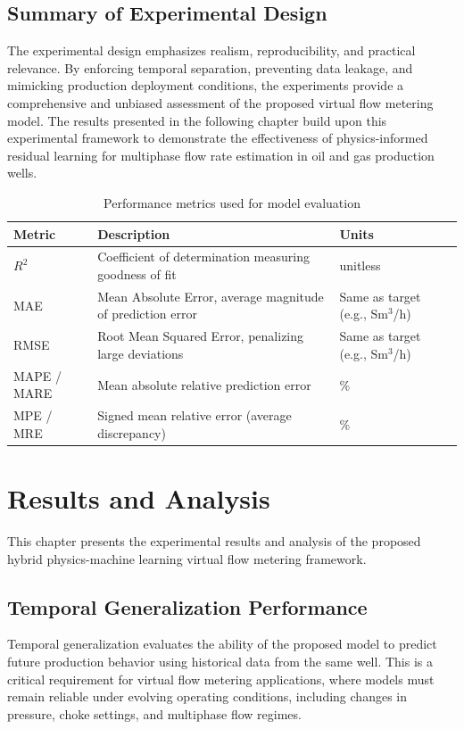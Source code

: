 \documentclass[12pt,APA]{uomthesis}
\begin{document}
\section{Summary of Experimental Design}
The experimental design emphasizes realism, reproducibility, and practical relevance. By enforcing temporal separation, preventing data leakage, and mimicking production deployment conditions, the experiments provide a comprehensive and unbiased assessment of the proposed virtual flow metering model. The results presented in the following chapter build upon this experimental framework to demonstrate the effectiveness of physics-informed residual learning for multiphase flow rate estimation in oil and gas production wells.

\begin{table}[h!]
\centering
\caption{Performance metrics used for model evaluation}
\label{tab:metrics}
\begin{tabularx}{\textwidth}{l X l}
\hline
\textbf{Metric} & \textbf{Description} & \textbf{Units} \\
\hline
$R^2$ &
Coefficient of determination measuring goodness of fit &
unitless \\

MAE &
Mean Absolute Error, average magnitude of prediction error &
Same as target (e.g., Sm$^3$/h) \\

RMSE &
Root Mean Squared Error, penalizing large deviations &
Same as target (e.g., Sm$^3$/h) \\

MAPE / MARE &
Mean absolute relative prediction error &
\% \\

MPE / MRE &
Signed mean relative error (average discrepancy) &
\% \\
\hline
\end{tabularx}
\end{table}


\chapter{Results and Analysis}
\label{ch:results}

This chapter presents the experimental results and analysis of the proposed hybrid physics-machine learning virtual flow metering framework. 

\section{Temporal Generalization Performance}
Temporal generalization evaluates the ability of the proposed model to predict future production behavior using historical data from the same well. This is a critical requirement for virtual flow metering applications, where models must remain reliable under evolving operating conditions, including changes in pressure, choke settings, and multiphase flow regimes.
\end{document}
